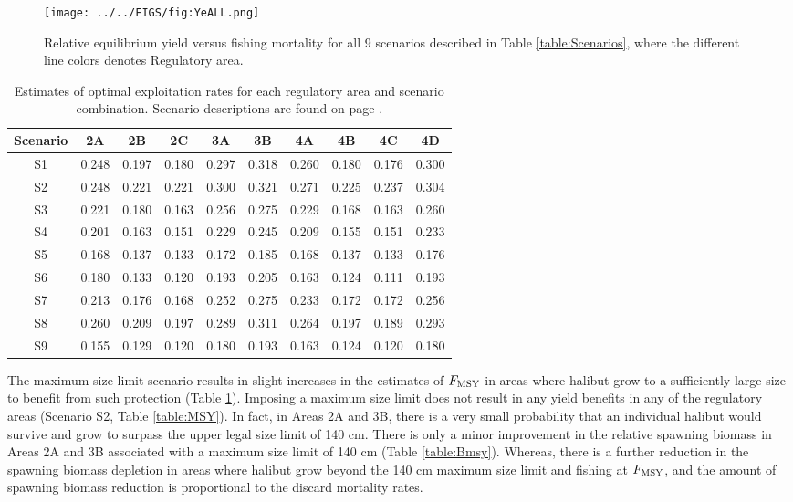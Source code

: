 \begin{figure}[htbp]
	\centering
		\texttt{[image: ../../FIGS/fig:YeALL.png]}
	\caption{Relative equilibrium yield versus fishing mortality for all 9 scenarios described in Table \ref{table:Scenarios}, where the different line colors denotes Regulatory area.}
	\label{fig:FIGS_fig:YeALL}
\end{figure}

\begin{table}
	\caption{Estimates of optimal exploitation rates for each regulatory area and scenario combination. Scenario descriptions are found on page \pageref{sub:scenarios}.}
	\label{table:Umsy}
	\begin{center}
		\begin{tabular}{c|ccccccccc}
		\hline
		Scenario & 2A & 2B & 2C & 3A & 3B & 4A & 4B & 4C & 4D\\
		\hline
		S1& 0.248 &0.197 &0.180 &0.297 &0.318 &0.260 &0.180 &0.176 &0.300\\
		S2& 0.248 &0.221 &0.221 &0.300 &0.321 &0.271 &0.225 &0.237 &0.304\\
		S3& 0.221 &0.180 &0.163 &0.256 &0.275 &0.229 &0.168 &0.163 &0.260\\
		S4& 0.201 &0.163 &0.151 &0.229 &0.245 &0.209 &0.155 &0.151 &0.233\\
		S5& 0.168 &0.137 &0.133 &0.172 &0.185 &0.168 &0.137 &0.133 &0.176\\
		S6& 0.180 &0.133 &0.120 &0.193 &0.205 &0.163 &0.124 &0.111 &0.193\\
		S7& 0.213 &0.176 &0.168 &0.252 &0.275 &0.233 &0.172 &0.172 &0.256\\
		S8& 0.260 &0.209 &0.197 &0.289 &0.311 &0.264 &0.197 &0.189 &0.293\\
		S9& 0.155 &0.129 &0.120 &0.180 &0.193 &0.163 &0.124 &0.120 &0.180\\
		\hline
		\end{tabular}
	\end{center}
\end{table}

The maximum size limit scenario results in slight increases in the estimates of $F_{\rm{MSY}}$ in areas where halibut grow to a sufficiently large size to benefit from such protection (Table \ref{table:Umsy}).  Imposing a maximum size limit does not result in any yield benefits in any of the regulatory areas (Scenario S2, Table \ref{table:MSY}).  In fact, in Areas 2A and 3B, there is a very small probability that an individual halibut would survive and grow to surpass the upper legal size limit of 140 cm. There is only a minor improvement in the relative spawning biomass in Areas 2A and 3B associated with a maximum size limit of 140 cm (Table \ref{table:Bmsy}).  Whereas, there is a further reduction in the spawning biomass depletion in areas where halibut grow beyond the 140 cm maximum size limit and fishing at $F_{\rm{MSY}}$, and the amount of spawning biomass reduction is proportional to the discard mortality rates.


